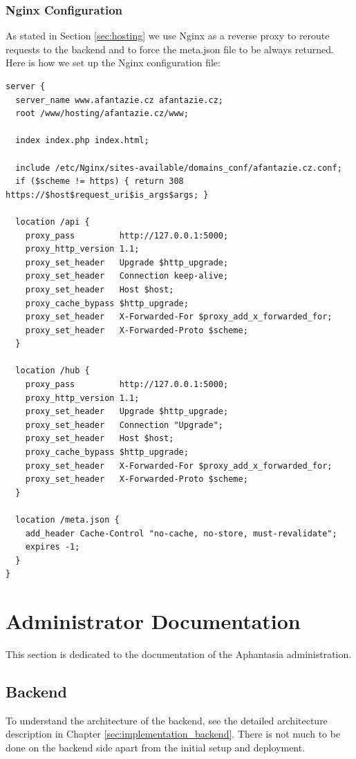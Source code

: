 \subsubsection{Nginx Configuration}
\label{sec:nginx_config}
As stated in Section \ref{sec:hosting} we use Nginx as a reverse proxy to reroute requests to the backend and to force the meta.json file to be always returned.
Here is how we set up the Nginx configuration file:
\begin{lstlisting}
server {
  server_name www.afantazie.cz afantazie.cz;
  root /www/hosting/afantazie.cz/www;

  index index.php index.html;

  include /etc/Nginx/sites-available/domains_conf/afantazie.cz.conf;
  if ($scheme != https) { return 308 https://$host$request_uri$is_args$args; }

  location /api {
    proxy_pass         http://127.0.0.1:5000;
    proxy_http_version 1.1;
    proxy_set_header   Upgrade $http_upgrade;
    proxy_set_header   Connection keep-alive;
    proxy_set_header   Host $host;
    proxy_cache_bypass $http_upgrade;
    proxy_set_header   X-Forwarded-For $proxy_add_x_forwarded_for;
    proxy_set_header   X-Forwarded-Proto $scheme;
  }

  location /hub {
    proxy_pass         http://127.0.0.1:5000;
    proxy_http_version 1.1;
    proxy_set_header   Upgrade $http_upgrade;
    proxy_set_header   Connection "Upgrade";
    proxy_set_header   Host $host;
    proxy_cache_bypass $http_upgrade;
    proxy_set_header   X-Forwarded-For $proxy_add_x_forwarded_for;
    proxy_set_header   X-Forwarded-Proto $scheme;
  }

  location /meta.json {
    add_header Cache-Control "no-cache, no-store, must-revalidate";
    expires -1;
  }
}
\end{lstlisting}

\section{Administrator Documentation}
This section is dedicated to the documentation of the Aphantasia administration.

\subsection{Backend}
To understand the architecture of the backend, see the detailed architecture description in Chapter \ref{sec:implementation_backend}.
There is not much to be done on the backend side apart from the initial setup and deployment.

